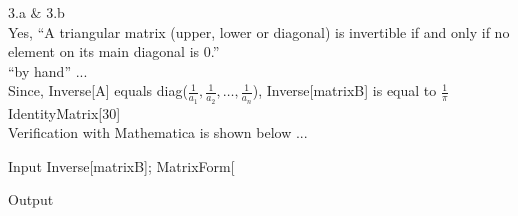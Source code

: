 \documentclass[11pt,a4paper]{article}
\begin{document}
3.a $\&$ 3.b\\
Yes, {``}A triangular matrix (upper, lower or diagonal) is invertible if and only if no element on its main diagonal is 0.{''}\\

{``}by hand{''} ...\\
Since, Inverse[A] equals diag($\frac{1}{a_1},\frac{1}{a_2},\ldots ,\frac{1}{a_n}$), Inverse[matrixB] is equal to $\frac{1}{\pi }$IdentityMatrix[30]\\

Verification with Mathematica is shown below ...

\begin{mmaCell}[moredefined={matrixB}]{Input}
Inverse[matrixB];
MatrixForm[%
\end{mmaCell}

\begin{mmaCell}[form=MatrixForm]{Output}

\end{mmaCell}
\end{document}
